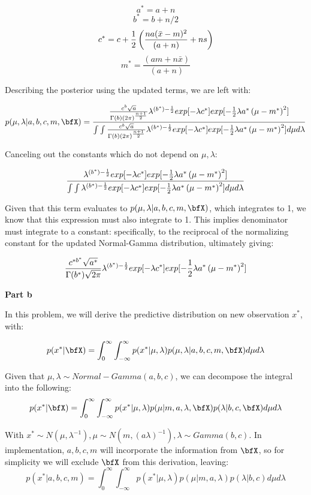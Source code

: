 \documentclass[twoside,11pt]{homework}
\begin{document}
\[
a^* = a+n
\]
\[
b^* = b + n/2
\]
\[
c^* = c + \frac{1}{2}\left(\frac{na(\bar{x} - m)^2}{(a+n)} + ns\right)
\]
\[
m^* = \frac{(am + n\bar{x})}{(a+n)}
\]

Describing the posterior using the updated terms, we are left with:

\[
p(\mu, \lambda | a, b, c, m, \bfX) = 
\frac{
\frac{c^b\sqrt{a}}{\Gamma{(b)}(2\pi)^{\frac{n+1}{2}}}
\lambda^{(b^*)-\frac{1}{2}}
exp[-\lambda c^*]
exp[-\frac{1}{2}\lambda a^*
\Parens{
\mu - m^*
}^2]
}
{\int \int
\frac{c^b\sqrt{a}}{\Gamma{(b)}(2\pi)^{\frac{n+1}{2}}}
\lambda^{(b^*)-\frac{1}{2}}
exp[-\lambda c^*]
exp[-\frac{1}{2}\lambda a^*
\Parens{
\mu - m^*
}^2]
d\mu d\lambda
}
\]

Canceling out the constants which do not depend on $\mu, \lambda$:

\[
\frac{
\lambda^{(b^*)-\frac{1}{2}}
exp[-\lambda c^*]
exp[-\frac{1}{2}\lambda a^*
\left(
\mu - m^*
\right)^2]
}
{\int \int
\lambda^{(b^*)-\frac{1}{2}}
exp[-\lambda c^*]
exp[-\frac{1}{2}\lambda a^*
\left(
\mu - m^*
\right)^2]
d\mu d\lambda
}
\]

Given that this term evaluates to $p(\mu, \lambda | a, b, c, m, \bfX)$, which integrates to 1,
we know that this expression must also integrate to 1.
This implies denominator must integrate to a constant:
specifically, to the reciprocal of the normalizing constant 
for the updated Normal-Gamma distribution, ultimately giving:

\[
\frac{c^{* b^*}\sqrt{a^*}}{\Gamma{(b^*)}\sqrt{2\pi}}
\lambda^{(b^*)-\frac{1}{2}}
exp[-\lambda c^*]
exp[-\frac{1}{2}\lambda a^*
\left(
\mu - m^*
\right)^2]
\]

\textbf{Part b}

In this problem, we will derive the predictive distribution on new observation $x^*$, with:

\[
p(x^*|\bfX) = \int_{0}^{\infty}\int_{-\infty}^{\infty} p(x^*|\mu, \lambda)p(\mu, \lambda | a, b, c, m, \bfX) d\mu d\lambda
\]

Given that $\mu, \lambda \sim Normal-Gamma(a, b, c)$, we can decompose the integral into the following:
\[
p(x^*|\bfX) = \int_{0}^{\infty}\int_{-\infty}^{\infty} p(x^*|\mu, \lambda)p(\mu | m, a, \lambda, \bfX) p(\lambda | b, c, \bfX)d\mu d\lambda
\]

With $x^* \sim N(\mu, \lambda^{-1}), \mu \sim N(m, (a\lambda)^{-1}), \lambda \sim Gamma(b, c)$.
In implementation, $a, b, c, m$ will incorporate the information from $\bfX$,
so for simplicity we will exclude $\bfX$ from this derivation, leaving:
\[
p(x^*|a, b, c, m) = \int_{0}^{\infty}\int_{-\infty}^{\infty} p(x^*|\mu, \lambda)p(\mu | m, a, \lambda) p(\lambda | b, c )d\mu d\lambda
\]
\end{document}
